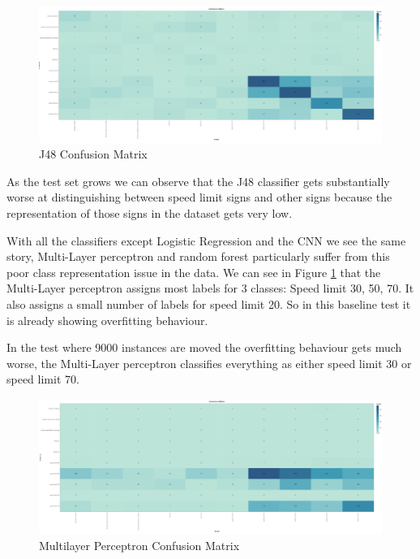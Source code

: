 \documentclass[11pt]{article}
\begin{document}
\begin{figure}[H]
  \caption {J48 Confusion Matrix}
  \centering 
  \includegraphics[width = \textwidth, height = 0.3\textheight, keepaspectratio]{Images/J48ConfMat.png}
\end{figure}
\FloatBarrier
\par
\par
As the test set grows we can observe that the J48 classifier gets substantially worse at distinguishing between speed limit signs and other signs because the representation of those signs in the dataset gets very low.

With all the classifiers except Logistic Regression and the CNN we see the same story, Multi-Layer perceptron and random forest particularly suffer from this poor class representation issue in the data. We can see in Figure \ref{MLPConfMat} that the Multi-Layer perceptron assigns most labels for 3 classes: Speed limit 30, 50, 70. It also assigns a small number of labels for speed limit 20. So in this baseline test it is already showing overfitting behaviour.

In the test where 9000 instances are moved the overfitting behaviour gets much worse, the Multi-Layer perceptron classifies everything as either speed limit 30 or speed limit 70.


\begin{figure}[h]
  \caption {Multilayer Perceptron Confusion Matrix} \label{MLPConfMat}
  \centering 
  \includegraphics[width = \textwidth, height = 0.3\textheight, keepaspectratio]{Images/Sec1-ConfMat2.png}
\end{figure}
\end{document}
